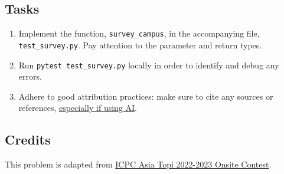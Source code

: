 \documentclass[a4paper]{exam}
\begin{document}
\begin{questions}
  \subsection*{Tasks}
  \begin{enumerate}
  \item Implement the function, \texttt{survey\_campus}, in the accompanying file, \texttt{test\_survey.py}. Pay attention to the parameter and return types.
  \item Run \texttt{pytest test\_survey.py} locally in order to identify and debug any errors.
  \item Adhere to good attribution practices: make sure to cite any sources or references, \href{https://hulms.instructure.com/courses/2616/discussion_topics/29240}{especially if using AI}.
  \end{enumerate}

  \subsection*{Credits}
  This problem is adapted from \href{https://giki.edu.pk/icpc/}{ICPC Asia Topi 2022-2023 Onsite Contest}.
  
\end{questions}
\end{document}
